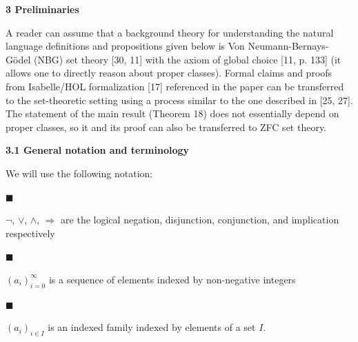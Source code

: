 
 
\par\medskip\noindent\textbf{3 Preliminaries}\par
 
 
A reader can assume that a background theory for understanding the natural language definitions and propositions given below is Von Neumann-Bernays-Gödel (NBG) set theory [30, 11] with the axiom of global choice [11, p. 133] (it allows one to directly reason about proper classes). Formal claims and proofs from Isabelle/HOL formalization [17] referenced in the paper can be transferred to the set-theoretic setting using a process similar to the one described in [25, 27]. The statement of the main result (Theorem 18) does not essentially depend on proper classes, so it and its proof can also be transferred to ZFC set theory.\par
 
 
 
\par\medskip\noindent\textbf{3.1 General notation and terminology}\par
 
 
We will use the following notation:\par
  
\par\noindent  $\blacksquare$ 
 
$\neg$, $\vee$, $\wedge$, $\Rightarrow$ are the logical negation, disjunction, conjunction, and implication respectively\par
 
 
 
\par\noindent  $\blacksquare$ 
 
$(a_{i})_{i=0}^{\infty}$ is a sequence of elements indexed by non-negative integers\par
 
 
 
\par\noindent  $\blacksquare$ 
 
$(a_{i})_{i\in I}$ is an indexed family indexed by elements of a set $I$.\par
 
 
